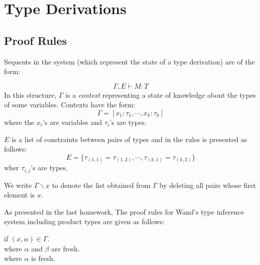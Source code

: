 \documentclass[11pt]{article}
\begin{document}



\section{Type Derivations}


\subsection{Proof Rules}

Sequents in the system (which represent the state of a type derivation) are of
the form:

\[\Gamma,E \vdash M : T\]
In this structure, $\Gamma$ is a {\em{context}} representing a state of
knowledge about the types of some variables.  Contexts have the form:
 \[\Gamma = [x_1:\tau_1,\cdots{},x_k:\tau_k]\]
where the $x_i$'s are variables and $\tau_i$'s are types.

$E$ is a list of constraints between pairs
of types and in the rules is presented as follows:
\[E=\{\tau_{(1,1)} = \tau_{(1,2)}, \cdots , \tau_{(k,1)} = \tau_{(k,2)}\}\]
wher $\tau_{i,j}$'s are types.  

We write $\Gamma\backslash{}x$ to denote the list obtained from $\Gamma$ by
deleting all pairs whose first element is $x$.

As presented in the last homework, The proof rules for Wand's type
inference system including product types are given as follows:


 {\hspace{.25in}} if $(x,\alpha)\in\Gamma$.
\vspace{.125in}\\

{\hspace{.25in}} where $\alpha$ and $\beta$ are fresh.
\vspace{.125in}\\

{\hspace{.25in}} where $\alpha$ is fresh.
\vspace{.125in}\\
\end{document}
